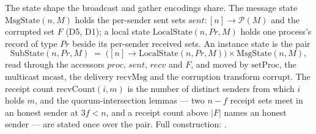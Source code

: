 \begin{definition}
  \label{def:aba-msgstate}
  \leanok
  The state shape the broadcast and gather encodings share.
  The message state $\mathrm{MsgState}(n, M)$ holds the per-sender sent sets $sent : [n] \to \mathcal{P}(M)$ and the corrupted set $F$ (D5, D1); a local state $\mathrm{LocalState}(n, Pr, M)$ holds one process's record of type $Pr$ beside its per-sender received sets.
  An instance state is the pair
  \[
    \mathrm{SubState}(n, Pr, M) \;=\; \bigl([n] \to \mathrm{LocalState}(n, Pr, M)\bigr) \times \mathrm{MsgState}(n, M),
  \]
  read through the accessors $\mathit{proc}$, $\mathit{sent}$, $\mathit{recv}$ and $F$, and moved by $\mathrm{setProc}$, the multicast $\mathrm{mcast}$, the delivery $\mathrm{recvMsg}$ and the corruption transform $\mathrm{corrupt}$.
  The receipt count $\mathrm{recvCount}(i, m)$ is the number of distinct senders from which $i$ holds $m$, and the quorum-intersection lemmas --- two $n{-}f$ receipt sets meet in an honest sender at $3f < n$, and a receipt count above $|F|$ names an honest sender --- are stated once over the pair.
  Full construction: .
\end{definition}
